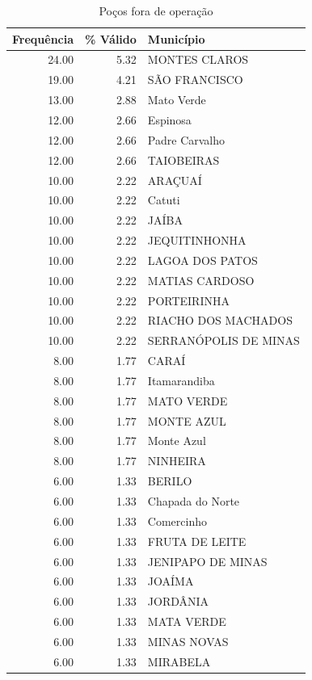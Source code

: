 \documentclass[a4paper, 12pt, openright, oneside, english, brazil, article]{abntex2}
\begin{document}
	\begin{scriptsize}
	\begin{longtable}{rrl}
		\caption{Poços fora de operação} \\
		\hline
		Frequência & \% Válido & Município \\ 
		\hline
		24.00 & 5.32 & MONTES CLAROS \\ 
		19.00 & 4.21 & SÃO FRANCISCO \\ 
		13.00 & 2.88 & Mato Verde \\ 
		12.00 & 2.66 & Espinosa \\ 
		12.00 & 2.66 & Padre Carvalho \\ 
		12.00 & 2.66 & TAIOBEIRAS \\ 
		10.00 & 2.22 & ARAÇUAÍ \\ 
		10.00 & 2.22 & Catuti \\ 
		10.00 & 2.22 & JAÍBA \\ 
		10.00 & 2.22 & JEQUITINHONHA \\ 
		10.00 & 2.22 & LAGOA DOS PATOS \\ 
		10.00 & 2.22 & MATIAS CARDOSO \\ 
		10.00 & 2.22 & PORTEIRINHA \\ 
		10.00 & 2.22 & RIACHO DOS MACHADOS \\ 
		10.00 & 2.22 & SERRANÓPOLIS DE MINAS \\ 
		8.00 & 1.77 & CARAÍ \\ 
		8.00 & 1.77 & Itamarandiba \\ 
		8.00 & 1.77 & MATO VERDE \\ 
		8.00 & 1.77 & MONTE AZUL \\ 
		8.00 & 1.77 & Monte Azul  \\ 
		8.00 & 1.77 & NINHEIRA \\ 
		6.00 & 1.33 & BERILO \\ 
		6.00 & 1.33 & Chapada do Norte \\ 
		6.00 & 1.33 & Comercinho \\ 
		6.00 & 1.33 & FRUTA DE LEITE \\ 
		6.00 & 1.33 & JENIPAPO DE MINAS \\ 
		6.00 & 1.33 & JOAÍMA \\ 
		6.00 & 1.33 & JORDÂNIA \\ 
		6.00 & 1.33 & MATA VERDE \\ 
		6.00 & 1.33 & MINAS NOVAS \\ 
		6.00 & 1.33 & MIRABELA \\ 

\end{longtable}
\end{scriptsize}
\end{document}
